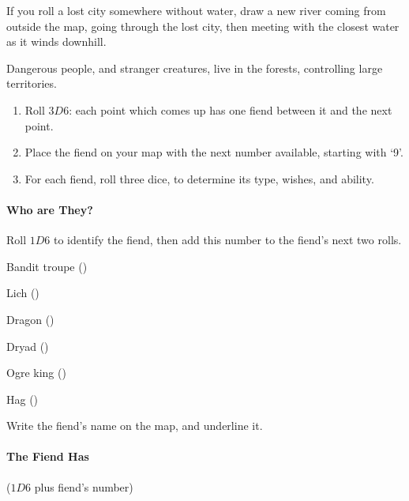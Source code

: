 \begin{multicols}{2}
\begin{multicols}{2}
\begin{dlist}
  If you roll a lost city somewhere without water, draw a new river coming from outside the map, going through the lost city, then meeting with the closest water as it winds downhill.
\end{dlist}
\end{multicols}

\label{mapFiends}

Dangerous people, and stranger creatures, live in the forests, controlling large territories.

\begin{enumerate}
\item
  Roll $3D6$: each point which comes up has one fiend between it and the
  next point.
\item
  Place the fiend on your map with the next number available, starting with `9'.
\item
  For each fiend, roll three dice, to determine its type, wishes, and
  ability.
\end{enumerate}

\paragraph{Who are They?}
\label{fiendTypes}

Roll $1D6$ to identify the fiend, then add this number to the fiend's next two rolls.

\begin{multicols}{2}
\begin{dlist}
\item
  Bandit troupe ()
\item
  Lich ()
\item
  Dragon ()
\item
  Dryad ()
\item
  Ogre king ()
\item
  Hag ()
\end{dlist}
\end{multicols}

Write the fiend's name on the map, and underline it.

\paragraph{The Fiend Has}

($1D6$ plus fiend's number)


\end{multicols}
